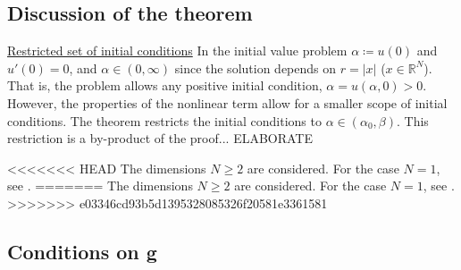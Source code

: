 \subsection{Discussion of the theorem}\hfill

\underline{Restricted set of initial conditions} In the initial value problem $\alpha\coloneqq u(0)$ and $u'(0)=0$, and $\alpha\in(0,\infty)$ since the solution depends on $r=|x|$ ($x\in\mathbb{R}^N$). That is, the problem allows any positive initial condition, $\alpha=u(\alpha,0)>0$. However, the properties of the nonlinear term allow for a smaller scope of initial conditions. The theorem restricts the initial conditions to $\alpha\in(\alpha_0,\beta)$. This restriction is a by-product of the proof... {\color{red} ELABORATE}

<<<<<<< HEAD
The dimensions $N\geq2$ are considered. For the case $N=1$, see \cite{}.
=======
The dimensions $N\geq2$ are considered. For the case $N=1$, see \cite{}. 
>>>>>>> e03346cd93b5d1395328085326f20581e3361581

\subsection{Conditions on g}\label{con}\hfill

